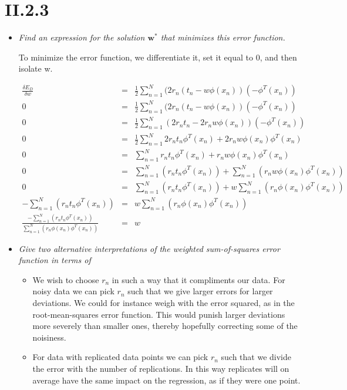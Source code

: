 \documentclass[12pt, a4paper]{article}
\begin{document}
\section{II.2.3}
\begin{itemize}
\item \textit{Find an expression for the solution $\textbf{w}^*$ that minimizes this error function.}

To minimize the error function, we differentiate it, set it equal to 0, and then isolate w.

\begin{eqnarray}
	\frac{\delta E_D}{\delta w} &=& \frac{1}{2}\sum^N_{n=1}(2r_n(t_n - w \phi (x_n))(-\phi^T (x_n))\\
	0 &=& \frac{1}{2}\sum^N_{n=1}(2r_n(t_n - w \phi (x_n))(-\phi^T (x_n))\\
	0 &=& \frac{1}{2}\sum^N_{n=1}(2r_nt_n - 2r_nw \phi (x_n))(-\phi^T (x_n))\\
	0 &=& \frac{1}{2}\sum^N_{n=1}2r_nt_n\phi^T (x_n) + 2r_nw \phi (x_n) \phi^T (x_n)\\	
	0 &=& \sum^N_{n=1}r_nt_n\phi^T (x_n) + r_nw \phi (x_n) \phi^T (x_n)\\
	0 &=& \sum^N_{n=1}(r_nt_n\phi^T (x_n)) + \sum^N_{n=1}(r_nw \phi (x_n) \phi^T (x_n))\\
	0 &=& \sum^N_{n=1}(r_nt_n\phi^T (x_n)) + w\sum^N_{n=1}(r_n \phi (x_n) \phi^T (x_n))\\
	-\sum^N_{n=1}(r_nt_n\phi^T (x_n)) &=& w\sum^N_{n=1}(r_n \phi (x_n) \phi^T (x_n))\\
	\frac{-\sum^N_{n=1}(r_nt_n\phi^T (x_n))}{\sum^N_{n=1}(r_n \phi (x_n) \phi^T (x_n))} &=& w
\end{eqnarray}


\item \textit{Give two alternative interpretations of the weighted sum-of-squares
error function in terms of}
\begin{itemize}

	\item We wish to choose $r_n$ in such a way that it compliments our data. For noisy data we can pick $r_n$ such that we give larger errors for larger deviations. We could for instance weigh with the error squared, as in the root-mean-squares error function. This would punish larger deviations more severely than smaller ones, thereby hopefully correcting some of the noisiness. 
	\item For data with replicated data points we can pick $r_n$ such that we divide the error with the number of replications. In this way replicates will on average have the same impact on the regression, as if they were one point.
 
\end{itemize}
\end{itemize}
\end{document}
